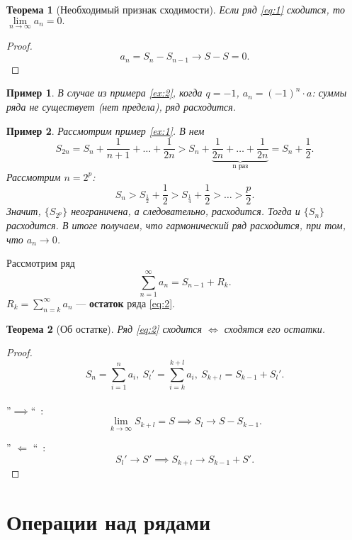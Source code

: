 \documentclass[12pt]{report}
\newtheorem{theorem}{Теорема}
\newtheorem{example}{Пример}
\begin{document}
\begin{theorem}[Необходимый признак сходимости]
Если ряд \eqref{eq:1} сходится, то $\lim\limits_{n \to \infty} a_n = 0.$
\end{theorem}
\begin{proof}
\[ a_n = S_n - S_{n-1} \to S - S = 0.\]
\end{proof}

\begin{example} \label{ex:3}
В случае из примера \ref{ex:2}, когда $q = -1$, $a_n = (-1)^n \cdot a$: суммы ряда не существует (нет предела), ряд расходится.
\end{example}

\begin{example} \label{ex:4}
Рассмотрим пример \ref{ex:1}. В нем
\[ S_{2n} = S_n + \frac{1}{n + 1} + \dots + \frac{1}{2n} > S_n + \underbrace{\frac{1}{2n} + \dots + \frac{1}{2n}}_{\text{n раз}} = S_n + \frac{1}{2}.\]
Рассмотрим $n = 2^p$:
\[S_n > S_{\frac{1}{2}} + \frac{1}{2} > S_{\frac{1}{4}} + \frac{1}{2} > \dots > \frac{p}{2}.\]
Значит, $\{ S_{2^p}\}$ неограничена, а следовательно, расходится. Тогда и $\{ S_n \}$ расходится. В итоге получаем, что гармонический ряд расходится, при том, что $a_n \to 0$.\\
\end{example}

Рассмотрим ряд
\begin{equation} \label{eq:2}
\sum_{n = 1}^{\infty} a_n = S_{n-1} + R_k.
\end{equation}
$R_k = \sum\limits_{n = k}^{\infty} a_n$ --- \textbf{остаток} ряда \eqref{eq:2}.

\begin{theorem}[Об остатке]
Ряд \eqref{eq:2} сходится $\iff$ сходятся его остатки.
\end{theorem}
\begin{proof}
\[S_n = \sum\limits_{i = 1}^{n}a_i,~S_l' = \sum\limits_{i = k}^{k + l} a_i,~S_{k+l} = S_{k-1} + S_l'.\]\\

''$\implies$``~:
\[ \lim_{k \to \infty}S_{k+l} = S \implies  S_l \to S - S_{k-1}.\]

'' $\Longleftarrow$ ``~:
\[ S_l' \to S' \implies S_{k+l} \to S_{k-1} + S'.\]
\end{proof}

\section{Операции над рядами}
\end{document}
